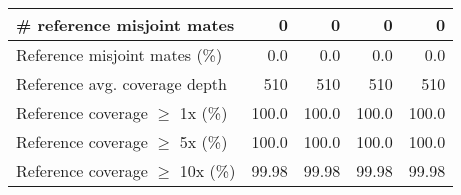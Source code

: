\documentclass[12pt,a4paper]{article}
\begin{document}
\begin{table}[ht]
\begin{center}
\begin{tabular}{|l*{4}{|r}|}
\# reference misjoint mates & 0 & 0 & 0 & 0 \\ \hline
Reference misjoint mates (\%) & 0.0 & 0.0 & 0.0 & 0.0 \\ \hline
Reference avg. coverage depth & 510 & 510 & 510 & 510 \\ \hline
Reference coverage $\geq$ 1x (\%) & 100.0 & 100.0 & 100.0 & 100.0 \\ \hline
Reference coverage $\geq$ 5x (\%) & 100.0 & 100.0 & 100.0 & 100.0 \\ \hline
Reference coverage $\geq$ 10x (\%) & 99.98 & 99.98 & 99.98 & 99.98 \\ \hline
\end{tabular}
\end{center}
\end{table}
\end{document}
